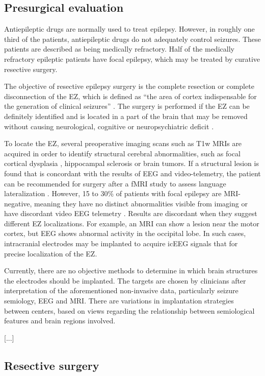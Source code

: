 \subsection{Presurgical evaluation}

Antiepileptic drugs are normally used to treat epilepsy.
However, in roughly one third of the patients, antiepileptic drugs do not adequately control seizures.
These patients are described as being medically refractory.
Half of the medically refractory epileptic patients have focal epilepsy, which may be treated by curative resective surgery.

The objective of resective epilepsy surgery is the complete resection or complete disconnection of the \ac{EZ}, which is defined as ``the area of cortex indispensable for the generation of clinical seizures'' \cite{rosenow_presurgical_2001}.
The surgery is performed if the \ac{EZ} can be definitely identified and is located in a part of the brain that may be removed without causing neurological, cognitive or neuropsychiatric deficit \cite{jobst_resective_2015}.

To locate the \ac{EZ}, several preoperative imaging scans such as \ac{T1w} \acp{MRI} are acquired in order to identify structural cerebral abnormalities, such as focal cortical dysplasia \cite{kabat_focal_2012}, hippocampal sclerosis \cite{thom_review_2014} or brain tumors.
If a structural lesion is found that is concordant with the results of \ac{EEG} and video-telemetry, the patient can be recommended for surgery after a \ac{fMRI} study to assess language lateralization \cite{duncan_brain_2016}.
However, 15 to 30\% of patients with focal epilepsy are \ac{MRI}-negative, meaning they have no distinct abnormalities visible from imaging or have discordant video \ac{EEG} telemetry \cite{bien_characteristics_2009}.
Results are discordant when they suggest different \ac{EZ} localizations.
For example, an \ac{MRI} can show a lesion near the motor cortex, but \ac{EEG} shows abnormal activity in the occipital lobe.
In such cases, intracranial electrodes may be implanted to acquire \ac{icEEG} signals that for precise localization of the \ac{EZ}.

Currently, there are no objective methods to determine in which brain structures the electrodes should be implanted.
The targets are chosen by clinicians after interpretation of the aforementioned non-invasive data, particularly seizure semiology, \ac{EEG} and \ac{MRI}.
There are variations in implantation strategies between centers, based on views regarding the relationship between semiological features and brain regions involved.

[...]



\subsection{Resective surgery}
